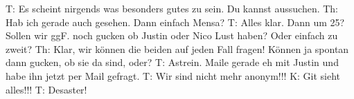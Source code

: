 T: Es scheint nirgends was besonders gutes zu sein. Du kannst aussuchen.
Th: Hab ich gerade auch gesehen. Dann einfach Mensa? 
T: Alles klar. Dann um 25? Sollen wir ggF. noch gucken ob Justin oder Nico Lust haben? Oder einfach zu zweit?
Th: Klar, wir können die beiden auf jeden Fall fragen! Können ja spontan dann gucken, ob sie da sind, oder? 
T: Astrein. Maile gerade eh mit Justin und habe ihn jetzt per Mail gefragt. 
T: Wir sind nicht mehr anonym!!!
K: Git sieht alles!!!
T: Desaster!
